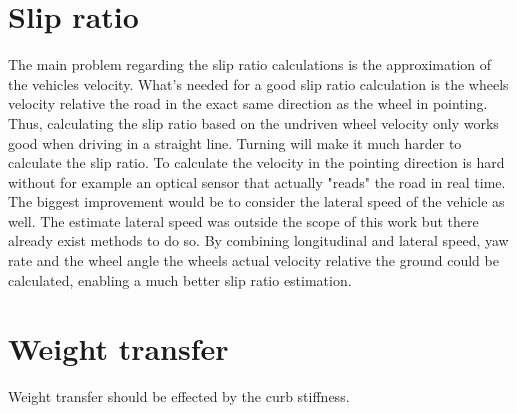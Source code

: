 \section{Slip ratio}
The main problem regarding the slip ratio calculations is the approximation of the vehicles velocity. What's needed for a good slip ratio calculation is the wheels velocity relative the road in the exact same direction as the wheel in pointing. Thus, calculating the slip ratio based on the undriven wheel velocity only works good when driving in a straight line. Turning will make it much harder to calculate the slip ratio. To calculate the velocity in the pointing direction is hard without for example an optical sensor that actually "reads" the road in real time. The biggest improvement would be to consider the lateral speed of the vehicle as well. The estimate lateral speed was outside the scope of this work but there already exist methods to do so. By combining longitudinal and lateral speed, yaw rate and the wheel angle the wheels actual velocity relative the ground could be calculated, enabling a much better slip ratio estimation.


\section{Weight transfer}
Weight transfer should be effected by the curb stiffness. 
